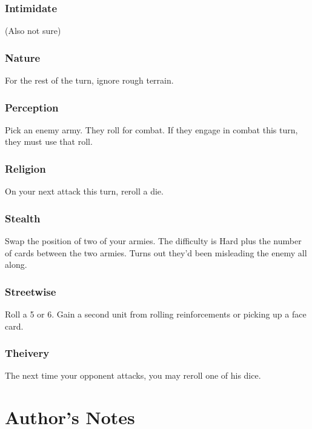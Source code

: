 \documentclass{article}
\begin{document}
\subsubsection{Intimidate}

(Also not sure)

\subsubsection{Nature}

For the rest of the turn, ignore rough terrain.

\subsubsection{Perception}

Pick an enemy army.  They roll for combat.  If they engage in combat this turn, they must use that roll.

\subsubsection{Religion}

On your next attack this turn, reroll a die.

\subsubsection{Stealth}

Swap the position of two of your armies.  The difficulty is Hard plus the number of cards between the two armies.  Turns out they'd been misleading the enemy all along.

\subsubsection{Streetwise}

Roll a 5 or 6.  Gain a second unit from rolling reinforcements or picking up a face card.

\subsubsection{Theivery}

The next time your opponent attacks, you may reroll one of his dice.

\newpage
\section{Author's Notes}
\end{document}
